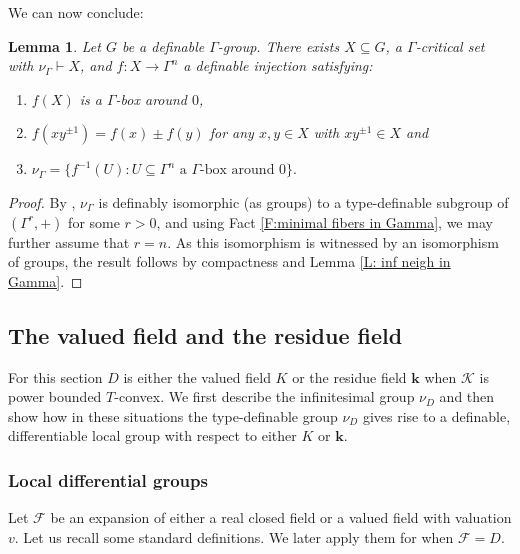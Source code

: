 \documentclass[11pt]{amsart}
\newtheorem{lemma}[theorem]{Lemma}
\theoremstyle{definition}
\newcommand{\bk}{\textbf{k}}
\newcommand{\CK}{{\mathcal K}}
\newcommand{\CF}{{\mathscr F}}
\newcommand{\0}{\emptyset}
\begin{document}
We can now conclude:

\begin{lemma}\label{L: nu in Gamma}
Let $G$ be a definable $\Gamma$-group. There exists $X\subseteq G$, a $\Gamma$-critical set with $\nu_{\Gamma}\vdash X$, and $f:X\to \Gamma^n$ a definable injection satisfying:
\begin{enumerate}
    \item $f(X)$ is a $\Gamma$-box around $0$,
    \item $f(xy^{\pm 1})=f(x)\pm f(y)$ for any $x,y\in X$ with $xy^{\pm 1}\in X$ and
    \item $\nu_\Gamma=\{f^{-1}(U): U\subseteq \Gamma^n \text{ a $\Gamma$-box around $0$}\}.$
\end{enumerate}
\end{lemma}
\begin{proof}
    By \cite[Theorems 7.4(3), 7.7(3), 7.11(2)]{HaHaPeGps}, $\nu_\Gamma$ is definably isomorphic (as groups) to a type-definable subgroup of $(\Gamma^r,+)$ for some $r>0$, and using Fact \ref{F:minimal fibers in Gamma}, we may further assume that $r=n$.
    As this isomorphism is witnessed by an isomorphism of groups, the result follows by compactness and Lemma \ref{L: inf neigh in Gamma}.
\end{proof}

\subsection{The valued field and the residue field}\label{ss: valued field and residue field}
For this section $D$ is either the valued field $K$ or the residue field $\bk$ when $\CK$ is power bounded $T$-convex. We first describe the infinitesimal group $\nu_D$ and then show how in these situations the type-definable group $\nu_D$  gives rise to a definable, differentiable local group with respect to either $K$ or $\bk$.

\subsubsection{Local differential groups}\label{sss:local differ group}
Let $\CF$ be an expansion of either a real closed field or a valued field with valuation $v$. Let us recall some standard definitions.  We later apply them for when $\CF=D$.
\end{document}
